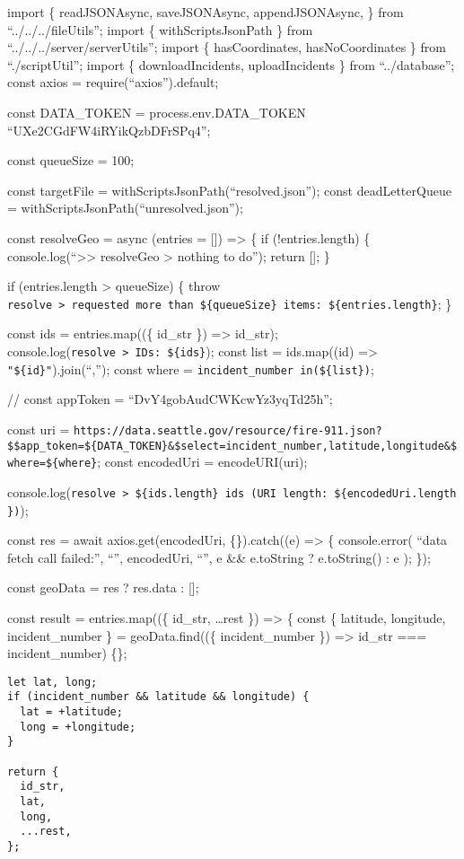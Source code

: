 \documentclass[
]{article}
\author{}
\date{\vspace{-2.5em}}
\begin{document}
import \{ readJSONAsync, saveJSONAsync, appendJSONAsync, \} from
``../../../fileUtils''; import \{ withScriptsJsonPath \} from
``../../../server/serverUtils''; import \{ hasCoordinates,
hasNoCoordinates \} from ``./scriptUtil''; import \{ downloadIncidents,
uploadIncidents \} from ``../database''; const axios =
require(``axios'').default;

const DATA\_TOKEN = process.env.DATA\_TOKEN \textbar\textbar{}
``UXe2CGdFW4iRYikQzbDFrSPq4'';

const queueSize = 100;

const targetFile = withScriptsJsonPath(``resolved.json''); const
deadLetterQueue = withScriptsJsonPath(``unresolved.json'');

const resolveGeo = async (entries = {[}{]}) =\textgreater{} \{ if
(!entries.length) \{ console.log(``\textgreater\textgreater{} resolveGeo
\textgreater{} nothing to do''); return {[}{]}; \}

if (entries.length \textgreater{} queueSize) \{ throw
\texttt{resolve\ \textgreater{}\ requested\ more\ than\ \$\{queueSize\}\ items:\ \$\{entries.length\}};
\}

const ids = entries.map((\{ id\_str \}) =\textgreater{} id\_str);
console.log(\texttt{resolve\ \textgreater{}\ IDs:\ \$\{ids\}}); const
list = ids.map((id) =\textgreater{} \texttt{"\$\{id\}"}).join(``,'');
const where = \texttt{incident\_number\ in(\$\{list\})};

// const appToken = ``DvY4gobAudCWKcwYz3yqTd25h'';

const uri =
\texttt{https://data.seattle.gov/resource/fire-911.json?\$\$app\_token=\$\{DATA\_TOKEN\}\&\$select=incident\_number,latitude,longitude\&\$where=\$\{where\}};
const encodedUri = encodeURI(uri);

console.log(\texttt{resolve\ \textgreater{}\ \$\{ids.length\}\ ids\ (URI\ length:\ \$\{encodedUri.length\})});

const res = await axios.get(encodedUri, \{\}).catch((e) =\textgreater{}
\{ console.error( ``data fetch call failed:'', ``\n'', encodedUri,
``\n'', e \&\& e.toString ? e.toString() : e ); \});

const geoData = res ? res.data : {[}{]};

const result = entries.map((\{ id\_str, \ldots rest \}) =\textgreater{}
\{ const \{ latitude, longitude, incident\_number \} = geoData.find((\{
incident\_number \}) =\textgreater{} id\_str === incident\_number)
\textbar\textbar{} \{\};

\begin{verbatim}
let lat, long;
if (incident_number && latitude && longitude) {
  lat = +latitude;
  long = +longitude;
}

return {
  id_str,
  lat,
  long,
  ...rest,
};
\end{verbatim}
\end{document}
